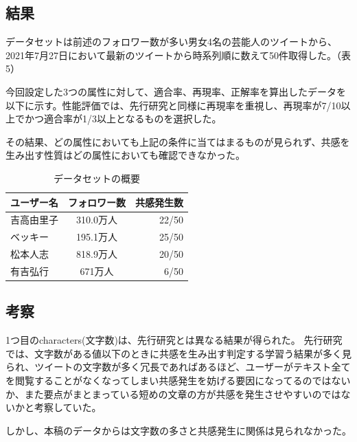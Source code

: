 \documentclass[dvipdfmx]{issj}
\begin{document}
\subsection{結果}  %
データセットは前述のフォロワー数が多い男女4名の芸能人のツイートから、2021年7月27日において最新のツイートから時系列順に数えて50件取得した。（表5）

今回設定した3つの属性に対して、適合率、再現率、正解率を算出したデータを以下に示す。性能評価では、先行研究と同様に再現率を重視し、再現率が7/10以上でかつ適合率が1/3以上となるものを選択した。

その結果、どの属性においても上記の条件に当てはまるものが見られず、共感を生み出す性質はどの属性においても確認できなかった。



\begin{table}[hbtp]
  \caption{データセットの概要}
  \label{table:data_type}
  \centering
  \begin{tabular}{lcr}
    \hline
   ユーザー名 & フォロワー数  &  共感発生数  \\
    \hline \hline
吉高由里子 & 310.0万人 &  22/50  \\
ベッキー & 195.1万人 &  25/50  \\
松本人志 & 818.9万人 &  20/50  \\
有吉弘行 & 671万人 &  6/50 \\
    \hline
  \end{tabular}
\end{table}




\subsection{考察}  %
1つ目のcharacters(文字数)は、先行研究とは異なる結果が得られた。
先行研究では、文字数がある値以下のときに共感を生み出す判定する学習う結果が多く見られ、ツイートの文字数が多く冗長であればあるほど、ユーザーがテキスト全てを閲覧することがなくなってしまい共感発生を妨げる要因になってるのではないか、また要点がまとまっている短めの文章の方が共感を発生させやすいのではないかと考察していた。

しかし、本稿のデータからは文字数の多さと共感発生に関係は見られなかった。
\end{document}
